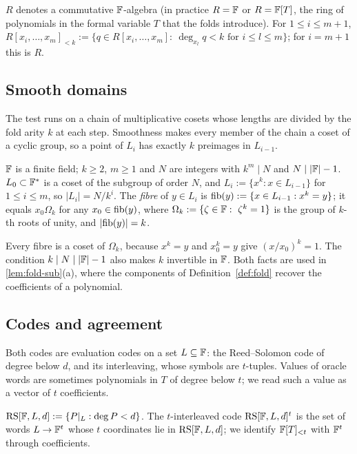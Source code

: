 \begin{definition}[Polynomials]\label{def:poly}
$R$ denotes a commutative $\mathbb{F}$-algebra (in practice $R=\mathbb{F}$ or $R=\mathbb{F}[T]$, the ring of
polynomials in the formal variable $T$ that the folds introduce). For $1\le i\le m+1$,
$R[x_i,\dots,x_m]_{<k}:=\{q\in R[x_i,\dots,x_m]:\ \deg_{x_l}q<k\text{ for }i\le l\le m\}$; for
$i=m+1$ this is $R$.
\end{definition}

\subsection{Smooth domains}\label{sec:domains}

The test runs on a chain of multiplicative cosets whose lengths are divided by the fold arity
$k$ at each step. Smoothness makes every member of the chain a coset of a cyclic group, so a
point of $L_i$ has exactly $k$ preimages in $L_{i-1}$.

\begin{definition}\label{def:domains}
$\mathbb{F}$ is a finite field; $k\ge 2$, $m\ge 1$ and $N$ are integers with $k^m\mid N$ and
$N\mid |\mathbb{F}|-1$. $L_0\subset\mathbb{F}^*$ is a coset of the subgroup of order $N$, and
$L_i:=\{x^k: x\in L_{i-1}\}$ for $1\le i\le m$, so $|L_i|=N/k^i$. The \emph{fibre} of
$y\in L_i$ is $\mathrm{fib}(y):=\{x\in L_{i-1}: x^k=y\}$; it equals $x_0\Omega_k$ for any
$x_0\in\mathrm{fib}(y)$, where $\Omega_k:=\{\zeta\in\mathbb{F}:\ \zeta^k=1\}$ is the group of $k$-th roots of unity, and $|\mathrm{fib}(y)|=k$.
\end{definition}

Every fibre is a coset of $\Omega_k$, because $x^k=y$ and $x_0^k=y$ give $(x/x_0)^k=1$. The
condition $k\mid N\mid|\mathbb{F}|-1$ also makes $k$ invertible in $\mathbb{F}$. Both facts are used in
\cref{lem:fold-sub}(a), where the components of Definition~\ref{def:fold} recover the
coefficients of a polynomial.

\subsection{Codes and agreement}\label{sec:codes}

Both codes are evaluation codes on a set $L\subseteq\mathbb{F}$: the Reed--Solomon code of degree
below $d$, and its interleaving, whose symbols are $t$-tuples. Values of oracle words
are sometimes polynomials in $T$ of degree below $t$; we read such a value as a vector of
$t$ coefficients.

\begin{definition}[Codes]\label{def:codes}
$\mathrm{RS}[\mathbb{F},L,d]:=\{P|_L:\deg P<d\}$. The $t$-interleaved code $\mathrm{RS}[\mathbb{F},L,d]^t$ is the set
of words $L\to\mathbb{F}^t$ whose $t$ coordinates lie in $\mathrm{RS}[\mathbb{F},L,d]$; we identify
$\mathbb{F}[T]_{<t}$ with $\mathbb{F}^t$ through coefficients.
\end{definition}

